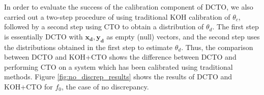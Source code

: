 \documentclass[12pt]{article}
\begin{document}
%
In order to evaluate the success of the calibration component of DCTO, we also carried out a two-step procedure of using traditional KOH calibration of $\theta_c$, followed by a second step using CTO to obtain a distribution of $\theta_d$. 
%
The first step is essentially DCTO with $\mathbf{x_d},\mathbf{y_d}$ as empty (null) vectors, and the second step uses the distributions obtained in the first step to estimate $\theta_d$.
%
Thus, the comparison between DCTO and KOH+CTO shows the difference between DCTO and performing CTO on a system which has been calibrated using traditional methods.
%
%
Figure \ref{fig:no_discrep_results} shows the results of DCTO and KOH+CTO for $f_0$, the case of no discrepancy.
%
\end{document}
